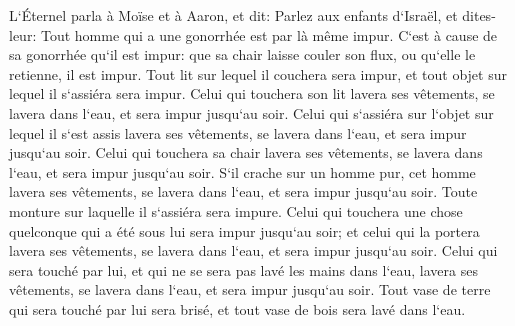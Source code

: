 \verse L`Éternel parla à Moïse et à Aaron, et dit: 
\verse Parlez aux enfants d`Israël, et dites-leur: Tout homme qui a une gonorrhée est par là même impur. 
\verse C`est à cause de sa gonorrhée qu`il est impur: que sa chair laisse couler son flux, ou qu`elle le retienne, il est impur. 
\verse Tout lit sur lequel il couchera sera impur, et tout objet sur lequel il s`assiéra sera impur. 
\verse Celui qui touchera son lit lavera ses vêtements, se lavera dans l`eau, et sera impur jusqu`au soir. 
\verse Celui qui s`assiéra sur l`objet sur lequel il s`est assis lavera ses vêtements, se lavera dans l`eau, et sera impur jusqu`au soir. 
\verse Celui qui touchera sa chair lavera ses vêtements, se lavera dans l`eau, et sera impur jusqu`au soir. 
\verse S`il crache sur un homme pur, cet homme lavera ses vêtements, se lavera dans l`eau, et sera impur jusqu`au soir. 
\verse Toute monture sur laquelle il s`assiéra sera impure. 
\verse Celui qui touchera une chose quelconque qui a été sous lui sera impur jusqu`au soir; et celui qui la portera lavera ses vêtements, se lavera dans l`eau, et sera impur jusqu`au soir. 
\verse Celui qui sera touché par lui, et qui ne se sera pas lavé les mains dans l`eau, lavera ses vêtements, se lavera dans l`eau, et sera impur jusqu`au soir. 
\verse Tout vase de terre qui sera touché par lui sera brisé, et tout vase de bois sera lavé dans l`eau. 
